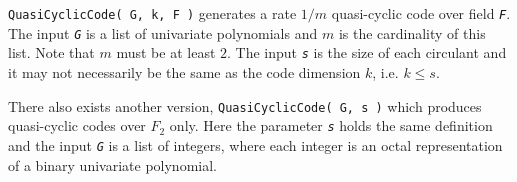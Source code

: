 \documentclass[a4paper,11pt]{report}
\begin{document}
{{{ \texttt{QuasiCyclicCode( G, k, F )} generates a rate $1/m$ quasi-cyclic code over field \mbox{\texttt{\mdseries\slshape F}}. The input \mbox{\texttt{\mdseries\slshape G}} is a list of univariate polynomials and $m$ is the cardinality of this list. Note that $m$ must be at least $2$. The input \mbox{\texttt{\mdseries\slshape s}} is the size of each circulant and it may not necessarily be the same as the
code dimension $k$, i.e. $k \le s$. 

 There also exists another version, \texttt{QuasiCyclicCode( G, s )} which produces quasi-cyclic codes over $F_2$ only. Here the parameter \mbox{\texttt{\mdseries\slshape s}} holds the same definition and the input \mbox{\texttt{\mdseries\slshape G}} is a list of integers, where each integer is an octal representation of a
binary univariate polynomial. }

}}
\end{document}
